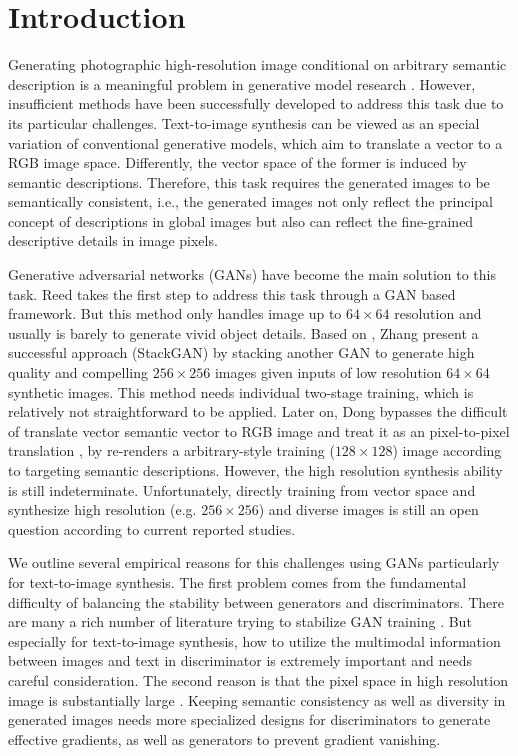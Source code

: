\documentclass[10pt,twocolumn,letterpaper]{article}
\begin{document}
\section{Introduction}
Generating photographic high-resolution image conditional on arbitrary semantic description is a meaningful problem in generative model research \cite{reed2016generative}. However, insufficient methods have been successfully developed to address this task due to its particular challenges. Text-to-image synthesis can be viewed as an special variation of conventional generative models, which aim to translate a vector to a RGB image space.  Differently, the vector space of the former is induced by semantic descriptions. Therefore, this task requires the generated images to be semantically consistent, i.e., the generated images not only reflect the principal concept of descriptions in global images but also can reflect the fine-grained descriptive details in image pixels. 

Generative adversarial networks (GANs) have become the main solution to this task. 
Reed \etal \cite{reed2016generative} takes the first step to address this task through a GAN based framework. But this method only handles image up to $64{\times}64$ resolution and usually is barely to generate vivid object details.
Based on \cite{reed2016generative}, Zhang \etal \cite{han2017stackgan} present a successful approach (StackGAN) by stacking another GAN to generate high quality and compelling $256{\times}256$ images given inputs of low resolution $64{\times}64$ synthetic images. This method needs individual two-stage training, which is relatively not straightforward to be applied. Later on, Dong \etal \cite{dong2017semantic} 
bypasses the difficult of translate vector semantic vector to RGB image and treat it as an pixel-to-pixel translation \cite{isola2016image}, by re-renders a arbitrary-style training ($128{\times}128$) image according to targeting semantic descriptions. However, the high resolution synthesis ability is still indeterminate. 
Unfortunately, directly training from vector space and synthesize high resolution (e.g. $256{\times}256$) and diverse images is still an open question according to current reported studies. 

We outline several empirical reasons for this challenges using GANs particularly for text-to-image synthesis. The first problem comes from the fundamental difficulty of balancing the stability between generators and discriminators. There are many a rich number of literature trying to stabilize GAN training \cite{salimans2016improved}. But especially for text-to-image synthesis, how to utilize the multimodal information between images and text in discriminator is extremely important and needs careful consideration. The second reason is that the pixel space in high resolution image is substantially large \cite{han2017stackgan}. Keeping semantic consistency as well as diversity in generated images needs more specialized designs for discriminators to generate effective gradients, as well as generators to prevent gradient vanishing. 
\end{document}
